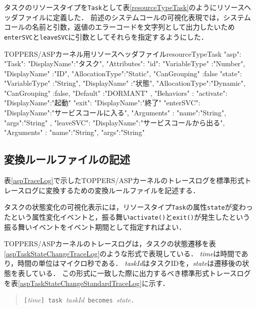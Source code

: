 タスクのリソースタイプを{\tt Task}として表\ref{resourceTypeTask}のようにリソースヘッダファイルに定義した．
前述のシステムコールの可視化表現では，システムコールの名前と引数，返値のエラーコードを文字列として出力したいため{\tt enterSVC}と{\tt leaveSVC}に引数としてそれらを指定するようにした．


\begin{FilePage}{TOPPERS/ASPカーネル用リソースヘッダファイル}{resourceTypeTask}
{
  "asp":
  {
    "Task":{
      "DisplayName":"タスク",
      "Attributes":{
        "id":{
          "VariableType"  :"Number",
          "DisplayName"   :"ID",
          "AllocationType":"Static",
          "CanGrouping"   :false
        }
        "state":{
          "VariableType"  :"String",
          "DisplayName"   :"状態",
          "AllocationType":"Dynamic",
          "CanGrouping"   :false,
          "Default"       :"DORMANT"
        }
      },
      "Behaviors"  :{
        "activate":{
          "DisplayName":"起動"
        }
        "exit":{
          "DisplayName":"終了"
        }
        "enterSVC":{
          "DisplayName":"サービスコールに入る",
          "Arguments"  :{
            "name":"String",
            "args":"String"
          }
        },
        "leaveSVC":{
          "DisplayName":"サービスコールから出る",
          "Arguments"  :{
            "name":"String",
            "args":"String"
          }
        }
      }
    }
  }
}
\end{FilePage}


\subsection{変換ルールファイルの記述}

表\ref{aspTraceLog}で示したTOPPERS/ASPカーネルのトレースログを標準形式トレースログに変換するための変換ルールファイルを記述する．

タスクの状態変化の可視化表示には，リソースタイプ{\tt Task}の属性{\tt state}が変わったという属性変化イベントと，振る舞い{\tt activate()}と{\tt exit()}が発生したという振る舞いイベントをイベント期間として指定すればよい．

TOPPERS/ASPカーネルのトレースログは，タスクの状態遷移を表\ref{aspTaskStateChangeTraceLog}のような形式で表現している．
{\it time}は時間であり，時間の単位はマイクロ秒である．
{\it taskId}はタスクIDを，{\it state}は遷移後の状態を表している．
この形式に一致した際に出力するべき標準形式トレースログを表\ref{aspTaskStateChangeStandardTraceLog}に示す．

\begin{table}[p]
\begin{quote}
\begin{breakbox}
{\tt [}{\it time}{\tt ] task }{\it taskId}{\tt \ becomes }{\it state}{\tt .}
\end{breakbox}
\caption{TOPPERS/ASPカーネルのトレースログにおけるタスクの状態遷移を表す形式}
\label{aspTaskStateChangeTraceLog}
\end{quote}
\end{table}

